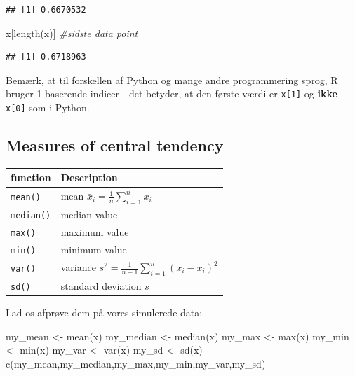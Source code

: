 \documentclass[
]{book}
\newenvironment{Shaded}{\begin{snugshade}}{\end{snugshade}}
\newcommand{\CommentTok}[1]{\textcolor[rgb]{0.56,0.35,0.01}{\textit{#1}}}
\newcommand{\FunctionTok}[1]{\textcolor[rgb]{0.00,0.00,0.00}{#1}}
\newcommand{\NormalTok}[1]{#1}
\newcommand{\OtherTok}[1]{\textcolor[rgb]{0.56,0.35,0.01}{#1}}
\begin{document}
\begin{verbatim}
## [1] 0.6670532
\end{verbatim}

\begin{Shaded}
\begin{Highlighting}[]
\NormalTok{x[}\FunctionTok{length}\NormalTok{(x)] }\CommentTok{\#sidste data point}
\end{Highlighting}
\end{Shaded}

\begin{verbatim}
## [1] 0.6718963
\end{verbatim}

Bemærk, at til forskellen af Python og mange andre programmering sprog, R bruger 1-baserende indicer - det betyder, at den første værdi er \texttt{x{[}1{]}} og \textbf{ikke} \texttt{x{[}0{]}} som i Python.

\hypertarget{measures-of-central-tendency}{%
\subsection{Measures of central tendency}\label{measures-of-central-tendency}}

\begin{longtable}[]{@{}ll@{}}
\toprule
function & Description \\
\midrule
\endhead
\texttt{mean()} & mean \(\bar{x}_{i} = \frac{1}{n}\sum_{i=1}^{n} x_{i}\) \\
\texttt{median()} & median value \\
\texttt{max()} & maximum value \\
\texttt{min()} & minimum value \\
\texttt{var()} & variance \(s^2 = \frac{1}{n-1}\sum_{i=1}^{n} (x_{i} - \bar{x}_{i})^2\) \\
\texttt{sd()} & standard deviation \(s\) \\
\bottomrule
\end{longtable}

Lad os afprøve dem på vores simulerede data:

\begin{Shaded}
\begin{Highlighting}[]
\NormalTok{my\_mean }\OtherTok{\textless{}{-}} \FunctionTok{mean}\NormalTok{(x)}
\NormalTok{my\_median }\OtherTok{\textless{}{-}} \FunctionTok{median}\NormalTok{(x)}
\NormalTok{my\_max }\OtherTok{\textless{}{-}} \FunctionTok{max}\NormalTok{(x)}
\NormalTok{my\_min }\OtherTok{\textless{}{-}} \FunctionTok{min}\NormalTok{(x)}
\NormalTok{my\_var }\OtherTok{\textless{}{-}} \FunctionTok{var}\NormalTok{(x)}
\NormalTok{my\_sd }\OtherTok{\textless{}{-}} \FunctionTok{sd}\NormalTok{(x)}
\FunctionTok{c}\NormalTok{(my\_mean,my\_median,my\_max,my\_min,my\_var,my\_sd)}
\end{Highlighting}
\end{Shaded}
\end{document}

